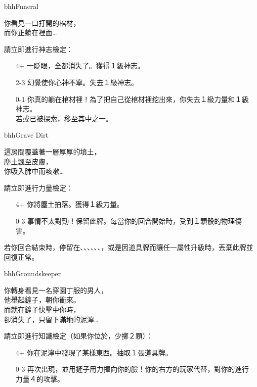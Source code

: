 \begin{EventCard}{bhh}{Funeral}
	\begin{CardStory}
		你看見一口打開的棺材，\\
		而你正躺在裡面…
	\end{CardStory}
	請立即進行神志檢定：
	\begin{itemize}
		\item[4+] 一眨眼，全都消失了。獲得１級神志。
		\item[2-3] 幻覺使你心神不寧。失去１級神志。
		\item[0-1] 你真的躺在棺材裡！為了把自己從棺材裡挖出來，你失去１級力量和１級神志。\\
		      若或已被探索，移至其中之一。
	\end{itemize}
\end{EventCard}%
\linebreak[0]%
\begin{EventCard}{bhh}{Grave Dirt}
	\begin{CardStory}
		這房間覆蓋著一層厚厚的墳土，\\
		塵土飄至皮膚，\\
		你吸入肺中而咳嗽…
	\end{CardStory}
	請立即進行力量檢定：
	\begin{itemize}
		\item[4+] 你將塵土拍落。獲得１級力量。
		\item[0-3] 事情不太對勁！保留此牌。每當你的回合開始時，受到１顆骰的物理傷害。
	\end{itemize}
	若你回合結束時，停留在、、、、、、，或是因道具牌而讓任一屬性升級時，丟棄此牌並回復正常。\smallbreak
\end{EventCard}%
\linebreak[0]%
\begin{EventCard}{bhh}{Groundskeeper}
	\begin{CardStory}
		你轉身看見一名穿園丁服的男人，\\
		他舉起鏟子，朝你衝來。\\
		而就在鏟子快擊中你時，\\
		卻消失了，只留下滿地的泥濘…
	\end{CardStory}
	請立即進行知識檢定（如果你位於，少擲２顆）：
	\begin{itemize}
		\item[4+] 你在泥濘中發現了某樣東西。抽取１張道具牌。
		\item[0-3] \ThisName{}再次出現，並用鏟子用力揮向你的臉！你的右方的玩家代替\ThisName{}，對你的進行力量４的攻擊。
	\end{itemize}
\end{EventCard}%
